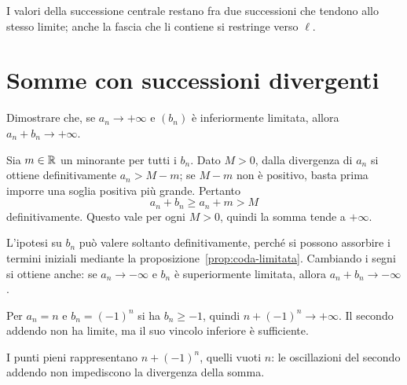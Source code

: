 \begin{schema}
\par\smallskip I valori della successione centrale restano fra due successioni che tendono allo stesso limite; anche la fascia che li contiene si restringe verso $\ell$.
\end{schema}

\section{Somme con successioni divergenti}

\begin{esercizio}
Dimostrare che, se $a_n\to+\infty$ e $(b_n)$ è inferiormente limitata, allora $a_n+b_n\to+\infty$.
\end{esercizio}
\begin{svolgimento}
Sia $m\in\mathbb{R}$ un minorante per tutti i $b_n$. Dato $M>0$, dalla divergenza di $a_n$ si ottiene definitivamente $a_n>M-m$; se $M-m$ non è positivo, basta prima imporre una soglia positiva più grande. Pertanto
\[
a_n+b_n\ge a_n+m>M
\]
definitivamente. Questo vale per ogni $M>0$, quindi la somma tende a $+\infty$.
\end{svolgimento}

L'ipotesi su $b_n$ può valere soltanto definitivamente, perché si possono assorbire i termini iniziali mediante la proposizione~\ref{prop:coda-limitata}. Cambiando i segni si ottiene anche: se $a_n\to-\infty$ e $b_n$ è superiormente limitata, allora $a_n+b_n\to-\infty$.

\begin{esempio}
Per $a_n=n$ e $b_n=(-1)^n$ si ha $b_n\ge-1$, quindi $n+(-1)^n\to+\infty$. Il secondo addendo non ha limite, ma il suo vincolo inferiore è sufficiente.
\end{esempio}

\begin{schema}
\par\smallskip I punti pieni rappresentano $n+(-1)^n$, quelli vuoti $n$: le oscillazioni del secondo addendo non impediscono la divergenza della somma.
\end{schema}

